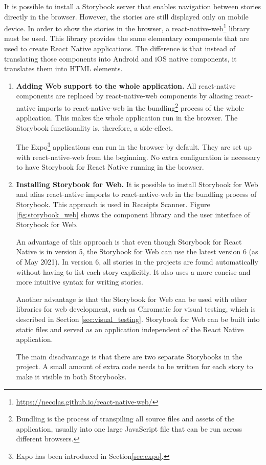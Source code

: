 \documentclass[
  digital, %
  table,   %
  oneside, %
  lof,     %
  lot,     %
]{fithesis3}
\begin{document}
It is possible to install a Storybook server that enables navigation between stories directly in the browser. However, the stories are still displayed only on mobile device. In order to show the stories in the browser, a react-native-web\footnote{\url{https://necolas.github.io/react-native-web/}} library must be used. This library provides the same elementary components that are used to create React Native applications. The difference is that instead of translating those components into Android and iOS native components, it translates them into HTML elements.

\begin{enumerate}
    \item \textbf{Adding Web support to the whole application.} All react-native components are replaced by react-native-web components by aliasing react-native imports to react-native-web in the bundling\footnote{Bundling is the process of transpiling all source files and assets of the application, usually into one large JavaScript file that can be run across different browsers.} process of the whole application. This makes the whole application run in the browser. The Storybook functionality is, therefore, a side-effect.
    
    The Expo\footnote{Expo has been introduced in Section\ref{sec:expo}.} applications can run in the browser by default. They are set up with react-native-web from the beginning. No extra configuration is necessary to have Storybook for React Native running in the browser.
    
    \item \textbf{Installing Storybook for Web.} It is possible to install Storybook for Web and alias react-native imports to react-native-web in the bundling process of Storybook. This approach is used in Receipts Scanner. Figure \ref{fig:storybook_web} shows the component library and the user interface of Storybook for Web.
    
    An advantage of this approach is that even though Storybook for React Native is in version 5, the Storybook for Web can use the latest version 6 (as of May 2021). In version 6, all stories in the projects are found automatically without having to list each story explicitly. It also uses a more concise and more intuitive syntax for writing stories.
    
    Another advantage is that the Storybook for Web can be used with other libraries for web development, such as Chromatic for visual testing, which is described in Section \ref{sec:visual_testing}. Storybook for Web can be built into static files and served as an application independent of the React Native application.
    
    The main disadvantage is that there are two separate Storybooks in the project. A small amount of extra code needs to be written for each story to make it visible in both Storybooks. 
    
\end{enumerate}
\end{document}

